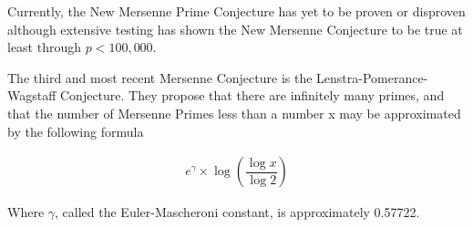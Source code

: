 Currently, the New Mersenne Prime Conjecture has yet to be proven or disproven although extensive testing
has shown the New Mersenne Conjecture to be true at least through $p < 100,000$.

The third and most recent Mersenne Conjecture is the Lenstra-Pomerance-Wagstaff
Conjecture. They propose that there are infinitely many primes, and that the number of
Mersenne Primes less than a number x may be approximated by the following formula~\cite{utm.edu-heuristic}

\begin{align}
e^{\gamma} \times \log \left( \dfrac{\log{x}}{\log{2}} \right)
\end{align}

Where $\gamma$, called the Euler-Mascheroni constant, is approximately 0.57722.
